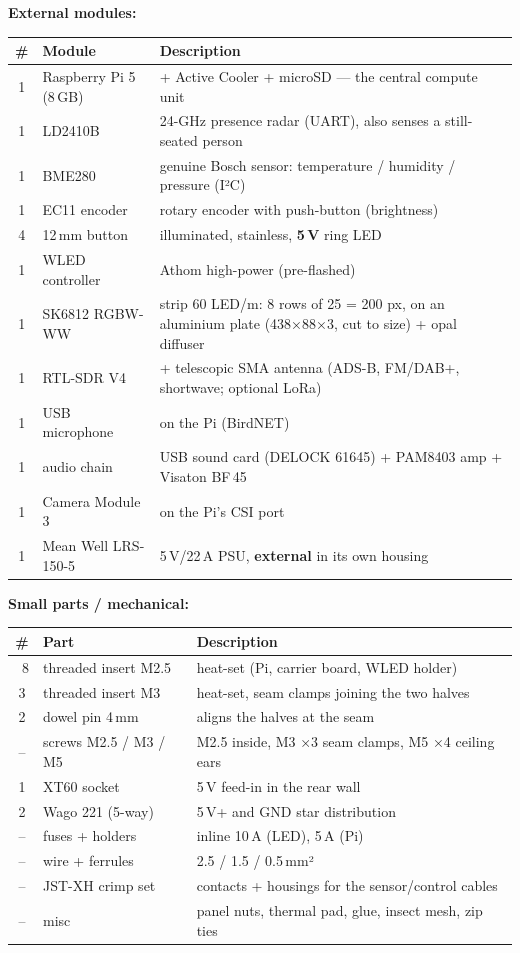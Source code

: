 \textbf{External modules:}\par
{}
\begin{tabular}{clp{88mm}}
\toprule
\textbf{\#} & \textbf{Module} & \textbf{Description} \\ \midrule
1 & Raspberry Pi 5 (8\,GB) & + Active Cooler + microSD — the central compute unit \\
1 & LD2410B & 24-GHz presence radar (UART), also senses a still-seated person \\
1 & BME280 & genuine Bosch sensor: temperature / humidity / pressure (I²C) \\
1 & EC11 encoder & rotary encoder with push-button (brightness) \\
4 & 12\,mm button & illuminated, stainless, \textbf{5\,V} ring LED \\
1 & WLED controller & Athom high-power (pre-flashed) \\
1 & SK6812 RGBW-WW & strip 60 LED/m: 8 rows of 25 = 200 px, on an aluminium plate (438×88×3, cut to size) + opal diffuser \\
1 & RTL-SDR V4 & + telescopic SMA antenna (ADS-B, FM/DAB+, shortwave; optional LoRa) \\
1 & USB microphone & on the Pi (BirdNET) \\
1 & audio chain & USB sound card (DELOCK 61645) + PAM8403 amp + Visaton BF\,45 \\
1 & Camera Module 3 & on the Pi's CSI port \\
1 & Mean Well LRS-150-5 & 5\,V/22\,A PSU, \textbf{external} in its own housing \\
\bottomrule
\end{tabular}

\textbf{Small parts / mechanical:}\par
{}
\begin{tabular}{clp{88mm}}
\toprule
\textbf{\#} & \textbf{Part} & \textbf{Description} \\ \midrule
~8 & threaded insert M2.5 & heat-set (Pi, carrier board, WLED holder) \\
3 & threaded insert M3 & heat-set, seam clamps joining the two halves \\
2 & dowel pin 4\,mm & aligns the halves at the seam \\
-- & screws M2.5 / M3 / M5 & M2.5 inside, M3 ×3 seam clamps, M5 ×4 ceiling ears \\
1 & XT60 socket & 5\,V feed-in in the rear wall \\
2 & Wago 221 (5-way) & 5\,V+ and GND star distribution \\
-- & fuses + holders & inline 10\,A (LED), 5\,A (Pi) \\
-- & wire + ferrules & 2.5 / 1.5 / 0.5\,mm² \\
-- & JST-XH crimp set & contacts + housings for the sensor/control cables \\
-- & misc & panel nuts, thermal pad, glue, insect mesh, zip ties \\
\bottomrule
\end{tabular}

